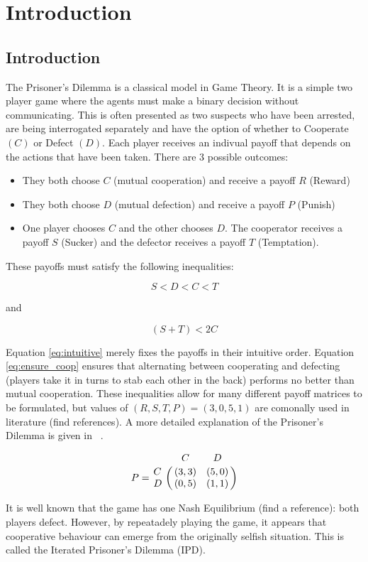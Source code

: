 \chapter{Introduction}\label{cha:introduction}

\section{Introduction}

The Prisoner's Dilemma is a classical model in Game Theory.
It is a simple two player game where the agents must make a binary decision without communicating.
This is often presented as two suspects who have been arrested, are being interrogated separately and have the option of whether to Cooperate $(C)$ or Defect $(D)$.
Each player receives an indivual payoff that depends on the actions that have been taken.
There are 3 possible outcomes:

\begin{itemize}  
\item They both choose $C$ (mutual cooperation) and receive a payoff $R$ (Reward)
\item They both choose $D$ (mutual defection) and receive a payoff $P$ (Punish)
\item One player chooses $C$ and the other chooses $D$. The cooperator receives a payoff $S$ (Sucker) and the defector receives a payoff $T$ (Temptation).
\end{itemize}

These payoffs must satisfy the following inequalities:

\begin{equation}\label{eq:intuitive}
S < D < C < T
\end{equation}

and

\begin{equation}\label{eq:ensure_coop}
(S + T) < 2 C
\end{equation}

Equation \ref{eq:intuitive} merely fixes the payoffs in their intuitive order.
Equation \ref{eq:ensure_coop} ensures that alternating between cooperating and defecting (players take it in turns to stab each other in the back) performs no better than mutual cooperation.
These inequalities allow for many different payoff matrices to be formulated, but values of $(R, S, T, P) = (3, 0, 5, 1)$ are comonally used in literature (find references).
A more detailed explanation of the Prisoner's Dilemma is given in ~\cite{Gotts2003}.

\begin{equation}\label{eq:payoff_matrix}
% 
P = \bordermatrix{~ & C & D \cr
                  C & (3, 3) & (5, 0) \cr
                  D & (0, 5) & (1, 1) \cr}
% 
\end{equation}

It is well known that the game has one Nash Equilibrium (find a reference): both players defect.
However, by repeatadely playing the game, it appears that cooperative behaviour can emerge from the originally selfish situation.
This is called the Iterated Prisoner's Dilemma (IPD).



